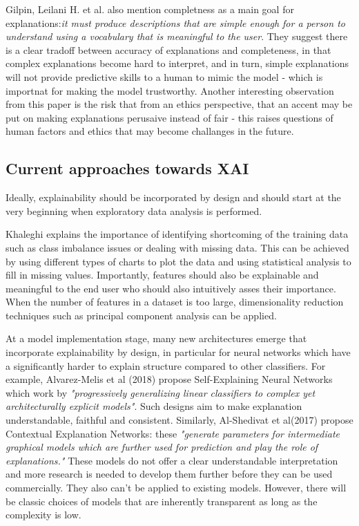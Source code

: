 \documentclass[proposal]{softeng}
\begin{document}
Gilpin, Leilani H. et al.\cite{GilpinLeilaniH} also mention completness as a main goal for explanations:\textit{it must produce descriptions that are simple enough for a person to understand using a vocabulary that is meaningful to the user}. They suggest there is a clear tradoff between accuracy of explanations and completeness, in that complex explanations become hard to interpret, and in turn, simple explanations will not provide predictive skills to a human to mimic the model - which is importnat for making the model trustworthy. Another interesting observation from this paper is the risk that from an ethics perspective, that an accent may be put on making explanations perusaive instead of fair - this raises questions of human factors and ethics that may become challanges in the future.

\subsection{Current approaches towards XAI}
Ideally, explainability should be incorporated by design and should start at the very beginning when exploratory data analysis is performed. 

Khaleghi \cite{khaleghi} explains the importance of identifying shortcoming of the training data such as class imbalance issues or dealing with missing data. This can be achieved by using different types of charts to plot the data and using statistical analysis to fill in missing values. Importantly, features should also be explainable and meaningful to the end user who should also intuitively asses their importance. When the number of features in a dataset is too large, dimensionality reduction techniques such as principal component analysis can be applied.

At a model implementation stage, many new architectures emerge that incorporate explainability by design, in particular for neural networks which have a significantly harder to explain structure compared to other classifiers. For example, Alvarez-Melis et al (2018)\cite{alvarezmelis2018robust} propose Self-Explaining Neural Networks which work by \textit{"progressively generalizing linear classifiers to complex yet architecturally explicit models"}. Such designs aim to make explanation understandable, faithful and consistent. Similarly, Al-Shedivat et al(2017)\cite{alshedivat2017contextual} propose Contextual Explanation Networks: these \textit{"generate parameters for intermediate graphical models which are further used for prediction and play the role of explanations."} These models do not offer a clear understandable interpretation and more research is needed to develop them further before they can be used commercially. They also can't be applied to existing models. However, there will be classic choices of models that are inherently transparent as long as the complexity is low. 
\end{document}
